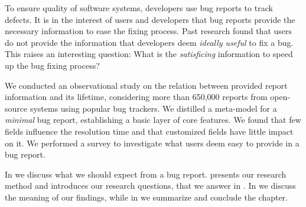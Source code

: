 

%

%

\newcommand{\RQ}[2]{%
\refstepcounter{RQCounter} \label{#1}
 \begin{center}
  \begin{examplebox}
   \textbf{RQ\arabic{RQCounter}.}~#2
  \end{examplebox}
 \end{center}
}




To ensure quality of software systems, developers use bug reports to track defects.
It is in the interest of users and developers that bug reports provide the necessary information to ease the fixing process.
Past research found that users do not provide the information that developers deem \emph{ideally useful} to fix a bug.
This raises an interesting question: What is the \emph{satisficing} information to speed up the bug fixing process?

We conducted an observational study on the relation between provided report information and its lifetime, considering more than 650,000 reports from open-source systems using popular bug trackers.
We distilled a meta-model for a \emph{minimal} bug report, establishing a basic layer of core features.
We found that few fields influence the resolution time and that customized fields have little impact on it.
We performed a survey to investigate what users deem easy to provide in a bug report.

\structure
In  we discuss what we should expect from a bug report.
 presents our research method and introduces our research questions, that we answer in .
In  we discuss the meaning of our findings, while in  we summarize and conclude the chapter.

\newpage


